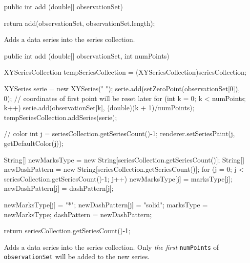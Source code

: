 \begin{code}

   public int add (double[] observationSet) \begin{hide} {
      return add(observationSet, observationSet.length);
   }\end{hide}
\end{code}
\begin{tabb}
   Adds a data series into the series collection.
\end{tabb}
\begin{htmlonly}
\end{htmlonly}
\begin{code}

   public int add (double[] observationSet, int numPoints) \begin{hide} {
      XYSeriesCollection tempSeriesCollection = (XYSeriesCollection)seriesCollection;

      XYSeries serie = new XYSeries(" ");
      serie.add(setZeroPoint(observationSet[0]), 0); // coordinates of first point will be reset later
      for (int k = 0; k < numPoints; k++)
         serie.add(observationSet[k], (double)(k + 1)/numPoints);
      tempSeriesCollection.addSeries(serie);

      // color
      int j = seriesCollection.getSeriesCount()-1;
      renderer.setSeriesPaint(j, getDefaultColor(j));

      String[] newMarksType = new String[seriesCollection.getSeriesCount()];
      String[] newDashPattern = new String[seriesCollection.getSeriesCount()];
      for (j = 0; j < seriesCollection.getSeriesCount()-1; j++) {
         newMarksType[j] = marksType[j];
         newDashPattern[j] = dashPattern[j];
      }

      newMarksType[j] = "*";
      newDashPattern[j] = "solid";
      marksType = newMarksType;
      dashPattern = newDashPattern;

      return seriesCollection.getSeriesCount()-1;
   }\end{hide}
\end{code}
\begin{tabb}
   Adds a data series into the series collection. Only \emph{the first}
  \texttt{numPoints} of \texttt{observationSet}
  will be added to the new series.
\end{tabb}
\begin{htmlonly}
\end{htmlonly}
